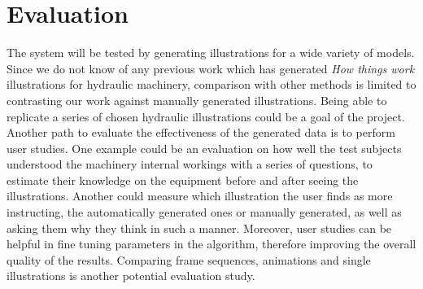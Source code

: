 \chapter{Evaluation}

The system will be tested by generating illustrations for a wide variety of models.
Since we do not know of any previous work which has generated \textit{How things work} illustrations for hydraulic machinery, comparison with other methods is limited to contrasting our work against manually generated illustrations.
Being able to replicate a series of chosen hydraulic illustrations could be a goal of the project. 
Another path to evaluate the effectiveness of the generated data is to perform user studies.
One example could be an evaluation on how well the test subjects understood the machinery internal workings with a series of questions, to estimate their knowledge on the equipment before and after seeing the illustrations.
Another could measure which illustration the user finds as more instructing, the automatically generated ones or manually generated, as well as asking them why they think in such a manner.
Moreover, user studies can be helpful in fine tuning parameters in the algorithm, therefore improving the overall quality of the results.
Comparing frame sequences, animations and single illustrations is another potential evaluation study.

